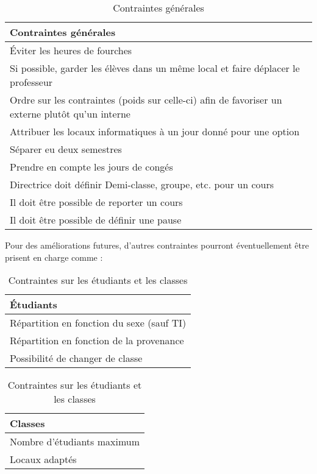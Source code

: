 \newpage

\begin{table}[!h]
\begin{center}
\begin{tabular}{|p{\linewidth}|}
\hline 
\textbf{Contraintes générales}\\
\hline
\hline
Éviter les heures de fourches\\
\hline
Si possible, garder les élèves dans un même local et faire déplacer le professeur\\
\hline
Ordre sur les contraintes (poids sur celle-ci) afin de favoriser un externe plutôt qu'un interne\\
\hline
Attribuer les locaux informatiques à un jour donné pour une option\\
\hline
Séparer eu deux semestres\\
\hline
Prendre en compte les jours de congés\\
\hline
Directrice doit définir Demi-classe, groupe, etc. pour un cours\\
\hline
Il doit être possible de reporter un cours\\
\hline
Il doit être possible de définir une pause\\
\hline
\end{tabular}
\end{center}
\caption{Contraintes générales}
\end{table}
\bigskip


Pour des améliorations futures, d'autres contraintes pourront éventuellement être prisent en charge comme :\\

\begin{table}[h!]
\begin{minipage}[t]{.3\linewidth}
\begin{tabular}{|l|}
\hline 
\textbf{Étudiants}\\
\hline
\hline
Répartition en fonction du sexe (sauf TI)\\
\hline
Répartition en fonction de la provenance\\
\hline
Possibilité de changer de classe\\
\hline
\end{tabular}
\end{minipage}
\hfill
\begin{minipage}[t]{.4\linewidth}
\begin{tabular}{|l|}
\hline 
\textbf{Classes}\\
\hline
\hline
Nombre d'étudiants maximum\\
\hline
Locaux adaptés\\
\hline
\end{tabular}
\end{minipage}

\caption{Contraintes sur les étudiants et les classes}
\label{etudiant_classes}
\end{table}
\bigskip




